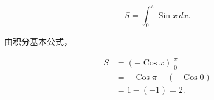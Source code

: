 \begin{answer}
\nopagebreak[4]
\[
S=\int_0^{\pi}\operatorname{Sin}x\,dx.
\]

由积分基本公式，

\nopagebreak[4]
\[
\begin{aligned}
S
&=\left(-\operatorname{Cos}x\right)\Big|_0^{\pi}\\
&=-\operatorname{Cos}\pi-\left(-\operatorname{Cos}0\right)\\
&=1-(-1)=2.
\end{aligned}
\]


\end{answer}